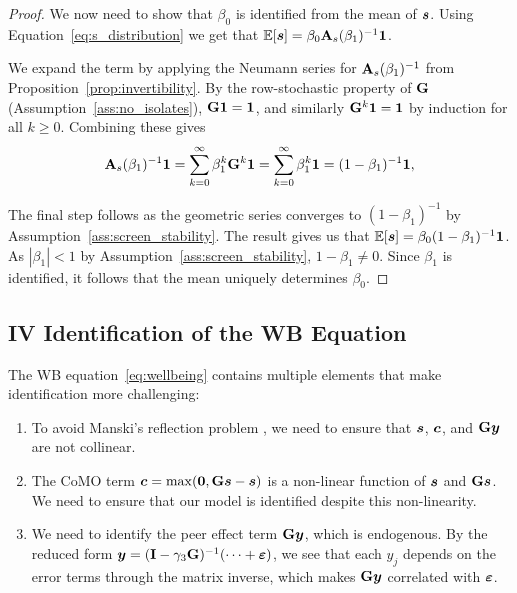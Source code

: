 \begin{proof}
We now need to show that $\beta_0$ is identified from the mean of $\bm{s}$. Using Equation~\eqref{eq:s_distribution} we get that $\mathbb{E}[\bm{s}] = \beta_0 \mathbf{A}_s(\beta_1)^{-1}\bm{1}$. 

We expand the term by applying the Neumann series for $\mathbf{A}_s(\beta_1)^{-1}$ from Proposition~\ref{prop:invertibility}. By the row-stochastic property of $\mathbf{G}$ (Assumption~\ref{ass:no_isolates}), $\mathbf{G}\bm{1} = \bm{1}$, and similarly $\mathbf{G}^k\bm{1} = \bm{1}$ by induction for all $k \geq 0$. Combining these gives
\[
    \mathbf{A}_s(\beta_1)^{-1}\bm{1}
    = \sum_{k=0}^{\infty} \beta_1^k \mathbf{G}^k \bm{1}
    = \sum_{k=0}^{\infty} \beta_1^k \bm{1}
    = (1 - \beta_1)^{-1}\bm{1},
\]

The final step follows as the geometric series converges to $(1-\beta_1)^{-1}$ by Assumption~\ref{ass:screen_stability}. The result gives us that $\mathbb{E}[\bm{s}] = \beta_0(1-\beta_1)^{-1}\bm{1}$. As $|\beta_1| < 1$ by Assumption~\ref{ass:screen_stability}, $1-\beta_1 \neq 0$. Since $\beta_1$ is identified, it follows that the mean uniquely determines $\beta_0$.
\end{proof}

\subsection{IV Identification of the WB Equation}
\label{sec:model:id_wellbeing}
The WB equation~\eqref{eq:wellbeing} contains multiple elements that make identification more challenging:

\begin{enumerate}
    \item To avoid Manski's reflection problem \parencite[Sec.~2]{Manski1993}, we need to ensure that $\bm{s}$, $\bm{c}$, and $\mathbf{G}\bm{y}$ are not collinear.
    \item The CoMO term $\bm{c} = \max(\bm{0}, \mathbf{G}\bm{s} - \bm{s})$ is a non-linear function of $\bm{s}$ and $\mathbf{G}\bm{s}$. We need to ensure that our model is identified despite this non-linearity.
    \item We need to identify the peer effect term $\mathbf{G}\bm{y}$, which is endogenous. By the reduced form $\bm{y} = (\mathbf{I} - \gamma_3\mathbf{G})^{-1}(\cdots + \bm{\varepsilon})$, we see that each $y_j$ depends on the error terms through the matrix inverse, which makes $\mathbf{G}\bm{y}$ correlated with $\bm{\varepsilon}$.
\end{enumerate}

